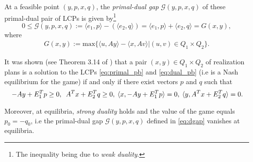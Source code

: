 \documentclass{article} %
\begin{document}
At a feasible point $(y, p, x, q)$, the \textit{primal-dual gap}
$\mathcal{G}(y, p, x, q)$ of these primal-dual pair of LCPs is given
by\footnote{The inequality being due to \textit{weak duality}.}
\begin{equation}
  0 \le \mathcal{G}(y, p, x, q) := \langle e_1, p\rangle - (\langle
  e_2, q\rangle) = \langle e_1, p\rangle + \langle
  e_2, q\rangle = G(x, y),
  \label{eq:dgap}
\end{equation}
where
\begin{eqnarray}
G(x, y) :=
\mathrm{max}\{\langle u, Ay\rangle - \langle x, Av\rangle |
(u,v) \in Q_1 \times Q_2\}.
\label{eq:xy_gap}
\end{eqnarray}

It was shown (see Theorem 3.14 of \cite{vonequilibrium}) that a pair
$(x, y) \in Q_1 \times Q_2$ of realization plans is a solution to the
LCPs \eqref{eq:primal_pb} and \eqref{eq:dual_pb} (i.e is a Nash
equilibrium for the game)  if and only if there exist vectors $p$ and
$q$ such that
\begin{equation}
\hspace{.25em} -Ay + E_1^Tp \ge 0, \hspace{.5em}A^Tx + E_2^Tq \ge
0, \hspace{.25em} \langle x, -Ay + E_1^Tp\rangle = 0, \hspace{.25em}
\langle y, A^Tx  + E_2^Tq\rangle = 0.
\label{eq:feasibility}
\end{equation}

Moreover, at equilibria, \textit{strong duality} holds and the value
of the game equals $p_0 = -q_0$, i.e the primal-dual gap
$\mathcal{G}(y, p, x, q)$ defined in \eqref{eq:dgap} vanishes at
equilibria.


\end{document}
